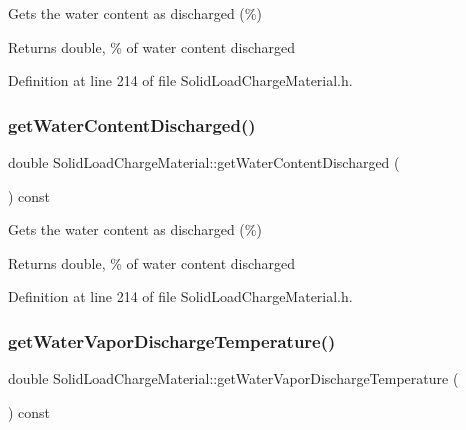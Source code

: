Gets the water content as discharged (\%) \begin{DoxyReturn}{Returns}
double, \% of water content discharged 
\end{DoxyReturn}


Definition at line 214 of file Solid\+Load\+Charge\+Material.\+h.

\mbox{\label{class_solid_load_charge_material_aeeb6b341a6b5770155b85264dabbd1a7}} 
\subsubsection{\texorpdfstring{get\+Water\+Content\+Discharged()}{getWaterContentDischarged()}\hspace{0.1cm}{\footnotesize\ttfamily [3/3]}}
{\footnotesize\ttfamily double Solid\+Load\+Charge\+Material\+::get\+Water\+Content\+Discharged (\begin{DoxyParamCaption}{ }\end{DoxyParamCaption}) const\hspace{0.3cm}{\ttfamily [inline]}}

Gets the water content as discharged (\%) \begin{DoxyReturn}{Returns}
double, \% of water content discharged 
\end{DoxyReturn}


Definition at line 214 of file Solid\+Load\+Charge\+Material.\+h.

\mbox{\label{class_solid_load_charge_material_a267f26d42f8ba2655c09f561fc0f6cb1}} 
\subsubsection{\texorpdfstring{get\+Water\+Vapor\+Discharge\+Temperature()}{getWaterVaporDischargeTemperature()}\hspace{0.1cm}{\footnotesize\ttfamily [1/3]}}
{\footnotesize\ttfamily double Solid\+Load\+Charge\+Material\+::get\+Water\+Vapor\+Discharge\+Temperature (\begin{DoxyParamCaption}{ }\end{DoxyParamCaption}) const\hspace{0.3cm}{\ttfamily [inline]}}

